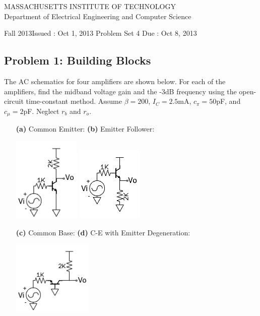 \documentclass[11pt,twoside]{article}
\newlength{\toppush}
\newcommand{\htitle}[3]{\begin{center}
\vspace*{-\toppush}
{\large MASSACHUSETTS INSTITUTE OF TECHNOLOGY}\\
{\small Department of Electrical Engineering and Computer Science}\\
\vspace*{1ex}{\Large #2}\end{center}
\noindent
\newline\parbox{6.5in}
{Fall 2013\hfill Issued : #1 \newline
 Problem Set 4 \hfill Due : #3\newline
}}
\newcommand{\handout}[3]{\thispagestyle{empty}
\pagestyle{myheadings}\htitle{#1}{#2}{#3}}
\begin{document}
\handout{Oct 1, 2013}{6.301 Solid State Circuits}{Oct 8, 2013}
\setlength{\parindent}{0pt}

\newcommand{\solution}{
 \medskip
 {\bf Solution:}
}

\hrulefill

\flushleft

\subsection*{Problem 1: Building Blocks}
The AC schematics for four amplifiers are shown below.
For each of the amplifiers, find the midband voltage gain and the -3dB frequency using the open-circuit time-constant method.
Assume $\beta=200$, $I_C=2.5$mA, $c_\pi=50$pF, and $c_\mu=2$pF.
Neglect $r_b$ and $r_o$.
\vspace{1ex}
\begin{enumerate}
	\item[\bf(a)] Common Emitter: \hspace{1.8in} {\bf(b)} Emitter Follower:
\begin{center}
\includegraphics[width=0.25\textwidth]{ce.png}
\hspace{2in}
\includegraphics[width=0.25\textwidth]{ef.png}
\end{center}
	\item[\bf(c)] Common Base: \hspace{2in} {\bf(d)} C-E with Emitter Degeneration:
\begin{center}
\includegraphics[width=0.3\textwidth]{cb.png}

\end{center}
\end{enumerate}
\end{document}
